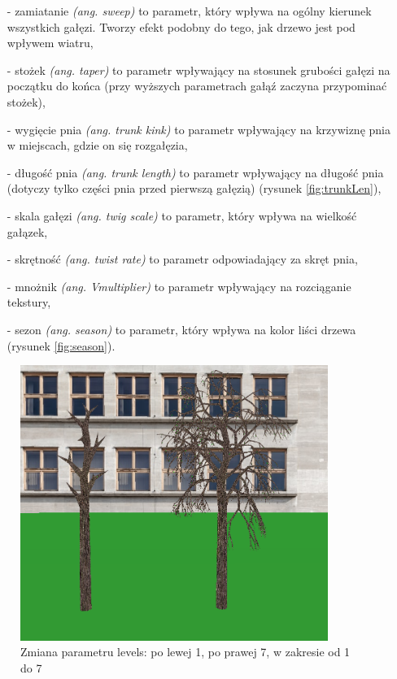 \documentclass[a4paper,twoside,12pt]{report}
\begin{document}
\begin{itemize}
	\item[-] zamiatanie \textit{(ang. sweep)} to parametr, który wpływa na ogólny kierunek wszystkich gałęzi. Tworzy efekt podobny do tego, jak drzewo jest pod wpływem wiatru,
	\item[-] stożek \textit{(ang. taper)} to parametr wpływający na stosunek grubości gałęzi na początku do końca (przy wyższych parametrach gałąź zaczyna przypominać stożek),
	\item[-] wygięcie pnia \textit{(ang. trunk kink)} to parametr wpływający na krzywiznę pnia w miejscach, gdzie on się rozgałęzia,
	\item[-] długość pnia \textit{(ang. trunk length)} to parametr wpływający na długość pnia (dotyczy tylko części pnia przed pierwszą gałęzią) (rysunek \ref{fig:trunkLen}),
	\item[-] skala gałęzi \textit{(ang. twig scale)} to parametr, który wpływa na wielkość gałązek,
	\item[-] skrętność \textit{(ang. twist rate)} to parametr odpowiadający za skręt pnia,
	\item[-] mnożnik \textit{(ang. Vmultiplier)} to parametr wpływający na rozciąganie tekstury,
	\item[-] sezon \textit{(ang. season)} to parametr, który wpływa na kolor liści drzewa (rysunek \ref{fig:season}).
\end{itemize}


\begin{figure}[H]
	\centering\includegraphics[width=10cm]{grafika/params/Levels.png}
	\caption{Zmiana parametru levels: po lewej 1, po prawej 7, w zakresie od 1 do 7}
    \label{fig:levels}
\end{figure}
\end{document}
